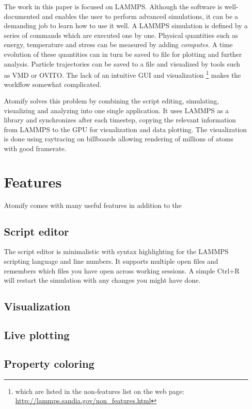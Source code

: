 \documentclass[aps,pre,twocolumn,letterpaper,floatfix]{revtex4}
\begin{document}
The work in this paper is focused on LAMMPS. Although the software is well-documented and enables the user to perform advanced simulations, it can be a demanding job to learn how to use it well. A LAMMPS simulation is defined by a series of commands which are executed one by one. Physical quantities such as energy, temperature and stress can be measured by adding \textit{computes}. A time evolution of these quantities can in turn be saved to file for plotting and further analysis. Particle trajectories can be saved to a file and visualized by tools such as VMD\cite{Humphrey1996Vmd} or OVITO\cite{Stukowski2009Visualization}. The lack of an intuitive GUI and visualization \footnote{which are listed in the non-features list on the web page: \url{http://lammps.sandia.gov/non_features.html}} makes the workflow somewhat complicated. 

Atomify solves this problem by combining the script editing, simulating, visualizing and analyzing into one single application. It uses LAMMPS as a library and synchronizes after each timestep, copying the relevant information from LAMMPS to the GPU for visualization and data plotting. The visualization is done using raytracing on billboards allowing rendering of millions of atoms with good framerate. 

\section{Features}
Atomify comes with many useful features in addition to the 
\subsection{Script editor}
The script editor is minimalistic with syntax highlighting for the LAMMPS scripting language and line numbers. It supports multiple open files and remembers which files you have open across working sessions. A simple Ctrl+R will restart the simulation with any changes you might have done.
\subsection{Visualization}

\subsection{Live plotting}

\subsection{Property coloring}
\end{document}
